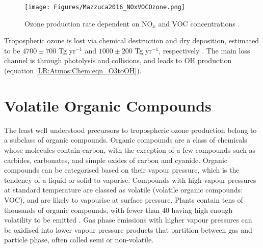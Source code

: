     \begin{figure}
      \texttt{[image: Figures/Mazzuca2016\_NOxVOCOzone.png]}
      \caption{Ozone production rate dependent on NO$_x$ and VOC concentrations \parencite{Mazzuca2016}.}
      \label{LR:VOCs:fig_NOXVOCOzone}
    \end{figure}
    
    Tropospheric ozone is lost via chemical destruction and dry deposition, estimated to be $4700\pm700$ Tg yr$^{-1}$ and $1000\pm200$ Tg yr$^{-1}$, respectively \parencite{Stevenson2006,Young2018}.
    The main loss channel is through photolysis and collisions, and leads to OH production (equation \ref{LR:Atmos:Chem:eqn_O3toOH}).
    
    

\section{Volatile Organic Compounds}
\label{LR:VOCs}

  The least well understood precursors to tropospheric ozone production belong to a subclass of organic compounds.
  Organic compounds are a class of chemicals whose molecules contain carbon, with the exception of a few compounds such as carbides, carbonates, and simple oxides of carbon and cyanide.
  Organic compounds can be categorised based on their vapour pressure, which is the tendency of a liquid or solid to vaporise.
  Compounds with high vapour pressures at standard temperature are classed as volatile (volatile organic compounds: VOC), and are likely to vapourise at surface pressure.
  Plants contain tens of thousands of organic compounds, with fewer than 40 having high enough volatility to be emitted \parencite{Guenther2000}.
  Gas phase emissions with higher vapour pressures can be oxidised into lower vapour pressure products that partition between gas and particle phase, often called semi or non-volatile. 
  
